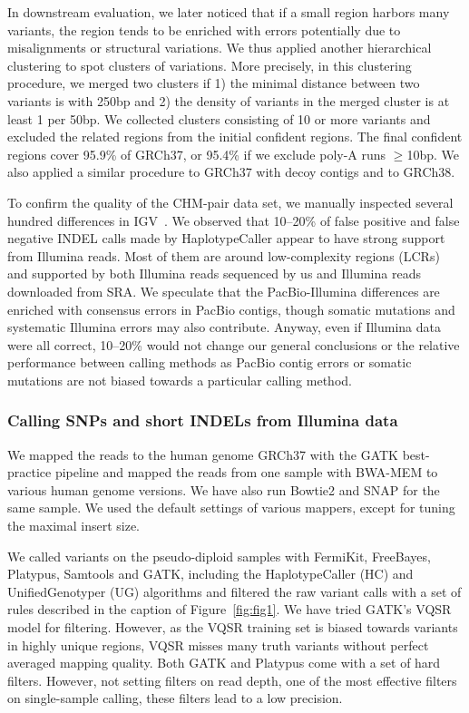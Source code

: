 \documentclass{bioinfo}
\begin{document}
\begin{methods}
In downstream evaluation, we later noticed that if a small region harbors many
variants, the region tends to be enriched with errors potentially due to
misalignments or structural variations.  We thus applied another hierarchical
clustering to spot clusters of variations.  More precisely, in this clustering
procedure, we merged two clusters if 1) the minimal distance between two
variants is with 250bp and 2) the density of variants in the merged cluster is
at least 1 per 50bp. We collected clusters consisting of 10 or more variants
and excluded the related regions from the initial confident regions. The final
confident regions cover 95.9\% of GRCh37, or 95.4\% if we exclude poly-A runs
$\ge$10bp. We also applied a similar procedure to GRCh37 with decoy contigs and
to GRCh38.

To confirm the quality of the CHM-pair data set, we manually inspected several
hundred differences in IGV~\citep{Robinson:2011uo}. We observed that 10--20\%
of false positive and false negative INDEL calls made by HaplotypeCaller appear
to have strong support from Illumina reads. Most of them are around
low-complexity regions (LCRs) and supported by both Illumina reads sequenced by
us and Illumina reads downloaded from SRA. We speculate that the
PacBio-Illumina differences are enriched with consensus errors in PacBio
contigs, though somatic mutations and systematic Illumina errors may also
contribute. Anyway, even if Illumina data were all correct, 10--20\% would not
change our general conclusions or the relative performance between calling
methods as PacBio contig errors or somatic mutations are not biased towards a
particular calling method.

\subsubsection*{Calling SNPs and short INDELs from Illumina data}

We mapped the reads to the human genome GRCh37 with the GATK best-practice
pipeline and mapped the reads from one sample with BWA-MEM to various human genome
versions. We have also run Bowtie2 and SNAP for the same sample. We used the
default settings of various mappers, except for tuning the maximal insert size.

We called variants on the pseudo-diploid samples with FermiKit, FreeBayes,
Platypus, Samtools and GATK, including the HaplotypeCaller (HC) and
UnifiedGenotyper (UG) algorithms and filtered the raw variant calls with a set
of rules described in the caption of Figure~\ref{fig:fig1}.  We have tried
GATK's VQSR model for filtering. However, as the VQSR training set is biased
towards variants in highly unique regions, VQSR misses many truth variants
without perfect averaged mapping quality. Both GATK and Platypus come with a
set of hard filters. However, not setting filters on read depth, one of the
most effective filters on single-sample calling, these filters lead to a low
precision.


\end{methods}
\end{document}
